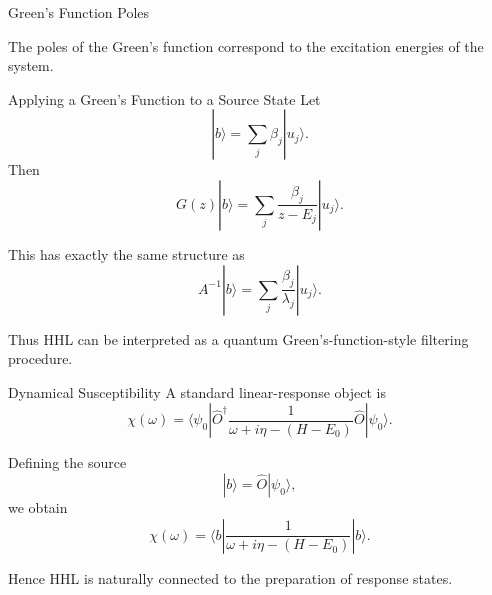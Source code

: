 \documentclass{beamer}
\begin{document}

\begin{frame}{Green's Function Poles}
\centering
{}

\vspace{0.3cm}
The poles of the Green's function correspond to the excitation energies of the system.
\end{frame}


\begin{frame}{Applying a Green's Function to a Source State}
Let
\[
|b\rangle = \sum_j \beta_j |u_j\rangle.
\]
Then
\[
G(z)|b\rangle
=
\sum_j \frac{\beta_j}{z-E_j}|u_j\rangle.
\]

This has exactly the same structure as
\[
A^{-1}|b\rangle
=
\sum_j \frac{\beta_j}{\lambda_j}|u_j\rangle.
\]

Thus HHL can be interpreted as a quantum Green's-function-style filtering procedure.
\end{frame}


\begin{frame}{Dynamical Susceptibility}
A standard linear-response object is
\[
\chi(\omega)
=
\langle \psi_0|
\hat{O}^\dagger
\frac{1}{\omega+i\eta-(H-E_0)}
\hat{O}
|\psi_0\rangle.
\]

Defining the source
\[
|b\rangle = \hat{O}|\psi_0\rangle,
\]
we obtain
\[
\chi(\omega)=
\langle b|
\frac{1}{\omega+i\eta-(H-E_0)}
|b\rangle.
\]

Hence HHL is naturally connected to the preparation of response states.
\end{frame}
\end{document}
